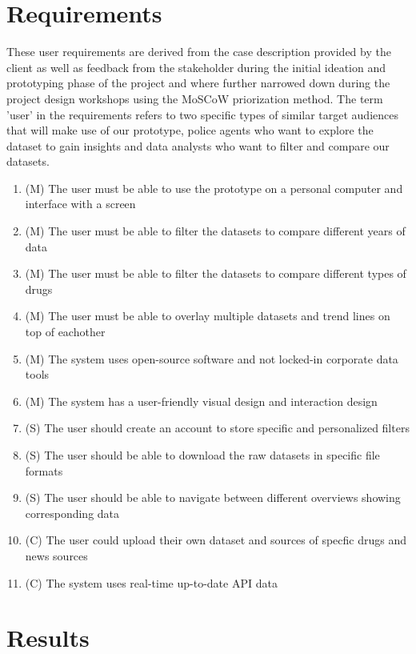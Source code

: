\section{Requirements}

These user requirements are derived from the case description provided by the client as well as feedback from the stakeholder during the initial ideation and prototyping phase of the project and where further narrowed down during the project design workshops using the MoSCoW priorization method. The term 'user' in the requirements refers to two specific types of similar target audiences that will make use of our prototype, police agents who want to explore the dataset to gain insights and data analysts who want to filter and compare our datasets.

\begin{enumerate}
  \item (M) The user must be able to use the prototype on a personal computer and interface with a screen
  \item (M) The user must be able to filter the datasets to compare different years of data
  \item (M) The user must be able to filter the datasets to compare different types of drugs
  \item (M) The user must be able to overlay multiple datasets and trend lines on top of eachother
  \item (M) The system uses open-source software and not locked-in corporate data tools
  \item (M) The system has a user-friendly visual design and interaction design
  \item (S) The user should create an account to store specific and personalized filters
  \item (S) The user should be able to download the raw datasets in specific file formats
  \item (S) The user should be able to navigate between different overviews showing corresponding data
  \item (C) The user could upload their own dataset and sources of specfic drugs and news sources
  \item (C) The system uses real-time up-to-date API data
\end{enumerate}

\section{Results}

